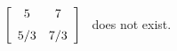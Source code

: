 {$\left[ \begin {array}{cc} 5&7\\\noalign{\medskip}5/3& 7/3\end {array}
 \right] $
 }
{\ttai\ does not exist.}
